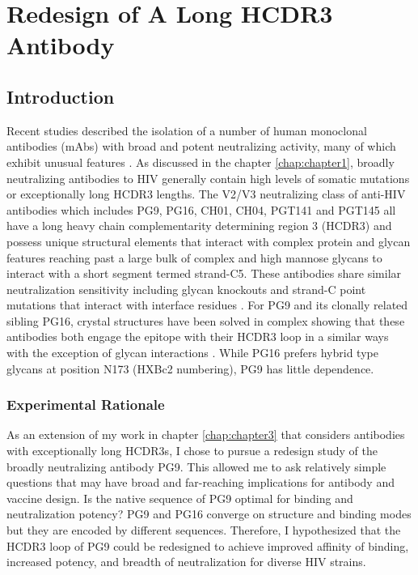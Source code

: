 \chapter{Redesign of A Long HCDR3 Antibody}
\label{chap:chapter4}
\section{Introduction}
Recent studies described the isolation of a number of human monoclonal antibodies (mAbs) with broad and potent neutralizing activity, many of which exhibit unusual features \citep{Bonsignori:2011dq,McLellan:2011dg,Walker:2009cd,Walker:2011ew}. As discussed in the chapter \ref{chap:chapter1}, broadly neutralizing antibodies to HIV generally contain high levels of somatic mutations or exceptionally long HCDR3 lengths. The V2/V3 neutralizing class of anti-HIV antibodies which includes PG9, PG16, CH01, CH04, PGT141 and PGT145 all have a long heavy chain complementarity determining region 3 (HCDR3) and possess unique structural elements that interact with complex protein and glycan features reaching past a large bulk of complex and high mannose glycans to interact with a short segment termed strand-C5. These antibodies share similar neutralization sensitivity including glycan knockouts and strand-C point mutations that interact with interface residues \citep{DoriaRose:2012if,Doores:2010gn}.  For PG9 and its clonally related sibling PG16, crystal structures have been solved in complex showing that these antibodies both engage the epitope with their HCDR3 loop in a similar ways with the exception of glycan interactions \citep{Pancera:2013ev}. While PG16 prefers hybrid type glycans at position N173 (HXBc2 numbering), PG9 has little dependence.

\subsection{Experimental Rationale}
As an extension of my work in chapter \ref{chap:chapter3} that considers antibodies with exceptionally long HCDR3s, I chose to pursue a redesign study of the broadly neutralizing antibody PG9. This allowed me to ask relatively simple questions that may have broad and far-reaching implications for antibody and vaccine design. Is the native sequence of PG9 optimal for binding and neutralization potency? PG9 and PG16 converge on structure and binding modes but they are encoded by different sequences. Therefore, I hypothesized that the HCDR3 loop of PG9 could be redesigned to achieve improved affinity of binding, increased potency, and breadth of neutralization for diverse HIV strains.

